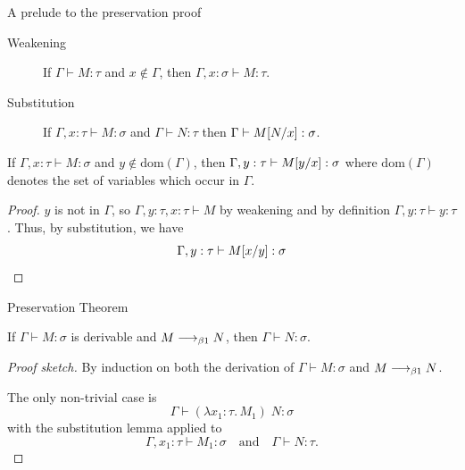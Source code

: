 \begin{frame}{A prelude to the preservation proof}
    \begin{description}
      \item[Weakening] If $\Gamma \vdash M : \tau$ and $x \not\in \Gamma$, then
        $\Gamma, x : \sigma \vdash M : \tau$. 
      \item[Substitution] If $\Gamma, x : \tau \vdash M : \sigma$ and $\Gamma
        \vdash N : \tau$ then $\Gamma \vdash M[{N}/{x}] : \sigma$.
    \end{description}

  \begin{corollary}
    If $\Gamma, x : \tau \vdash M :\sigma$ and $y \not\in \mathrm{dom}(\Gamma)$, then $ \Gamma, y : \tau \vdash M[{y}/{x}] :
    \sigma$
    where $\mathrm{dom}(\Gamma)$
    denotes the set of variables which occur in $\Gamma$.
  \end{corollary}
  \begin{proof}
    $y$ is not in $\Gamma$, so 
      $\Gamma, y : \tau, x : \tau \vdash M$
    by weakening and by definition $\Gamma, y : \tau \vdash y : \tau$.
    Thus, by substitution, we have
    \[
      \Gamma, y : \tau \vdash M[{x}/{y}] : \sigma
    \]
  \end{proof}
\end{frame}

\begin{frame}{Preservation Theorem}
  \begin{theorem}
    If $\Gamma \vdash M : \sigma$ is derivable and $M \longrightarrow_{\beta1} N$, then $\Gamma \vdash N : \sigma$. 
  \end{theorem}
  \begin{proof}[Proof sketch]
  By induction on both the derivation of $\Gamma \vdash M :
  \sigma$ and $M \longrightarrow_{\beta1} N$.

  The only non-trivial case is
  \[
    \Gamma \vdash (\lambda  x_1 : \tau .\, M_1)\; N : \sigma%
  \]
  with the substitution lemma applied to
  \[
    \Gamma, x_1 : \tau \vdash M_1 : \sigma
    \quad\text{and}\quad
    \Gamma \vdash N : \tau.
  \]
\end{proof}
  
\end{frame}

